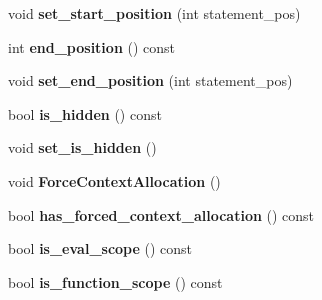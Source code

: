 \begin{DoxyCompactItemize}
\item 
void {\bfseries set\+\_\+start\+\_\+position} (int statement\+\_\+pos)\hypertarget{classv8_1_1internal_1_1_scope_ab8b18eaeaf400ee1798af3a45fb4cd50}{}\label{classv8_1_1internal_1_1_scope_ab8b18eaeaf400ee1798af3a45fb4cd50}

\item 
int {\bfseries end\+\_\+position} () const \hypertarget{classv8_1_1internal_1_1_scope_aad5f40c0ebef98d84cd51cb31cf6eb53}{}\label{classv8_1_1internal_1_1_scope_aad5f40c0ebef98d84cd51cb31cf6eb53}

\item 
void {\bfseries set\+\_\+end\+\_\+position} (int statement\+\_\+pos)\hypertarget{classv8_1_1internal_1_1_scope_a11abdf08eaa1d0a868efa18e28468820}{}\label{classv8_1_1internal_1_1_scope_a11abdf08eaa1d0a868efa18e28468820}

\item 
bool {\bfseries is\+\_\+hidden} () const \hypertarget{classv8_1_1internal_1_1_scope_adcd22376ea921344e440d1ba6070db85}{}\label{classv8_1_1internal_1_1_scope_adcd22376ea921344e440d1ba6070db85}

\item 
void {\bfseries set\+\_\+is\+\_\+hidden} ()\hypertarget{classv8_1_1internal_1_1_scope_aa34113cf6e6a0795359b611dcfa234ac}{}\label{classv8_1_1internal_1_1_scope_aa34113cf6e6a0795359b611dcfa234ac}

\item 
void {\bfseries Force\+Context\+Allocation} ()\hypertarget{classv8_1_1internal_1_1_scope_a08eab8b737d072b027ea0edb3f5e5134}{}\label{classv8_1_1internal_1_1_scope_a08eab8b737d072b027ea0edb3f5e5134}

\item 
bool {\bfseries has\+\_\+forced\+\_\+context\+\_\+allocation} () const \hypertarget{classv8_1_1internal_1_1_scope_a8379e548a3dcc952762822ba740c2be5}{}\label{classv8_1_1internal_1_1_scope_a8379e548a3dcc952762822ba740c2be5}

\item 
bool {\bfseries is\+\_\+eval\+\_\+scope} () const \hypertarget{classv8_1_1internal_1_1_scope_ab1a48d82c89c499b7a55fd6ea27a7962}{}\label{classv8_1_1internal_1_1_scope_ab1a48d82c89c499b7a55fd6ea27a7962}

\item 
bool {\bfseries is\+\_\+function\+\_\+scope} () const \hypertarget{classv8_1_1internal_1_1_scope_a57d46167bd0008a565f55d2affcc468c}{}\label{classv8_1_1internal_1_1_scope_a57d46167bd0008a565f55d2affcc468c}


\end{DoxyCompactItemize}
